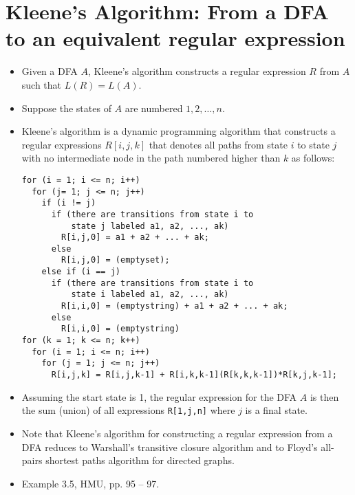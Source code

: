 \documentclass[]{article}
\begin{document}
\section{Kleene's Algorithm: From a DFA to an equivalent regular expression}
  \begin{itemize}
    \item Given a DFA $A$, Kleene's algorithm constructs a regular expression
    $R$ from $A$ such that $L(R) = L(A)$.
    \item Suppose the states of $A$ are numbered $1, 2, \ldots, n$.
    \item Kleene's algorithm is a dynamic programming algorithm that constructs
    a regular expressions $R[i, j, k]$ that denotes all paths from state $i$ to
    state $j$ with no intermediate node in the path numbered higher than $k$ as
    follows:

    \newpage
      \begin{lstlisting}
for (i = 1; i <= n; i++)
  for (j= 1; j <= n; j++)
    if (i != j)
      if (there are transitions from state i to
          state j labeled a1, a2, ..., ak)
        R[i,j,0] = a1 + a2 + ... + ak;
      else
        R[i,j,0] = (emptyset);
    else if (i == j)
      if (there are transitions from state i to
          state i labeled a1, a2, ..., ak)
        R[i,i,0] = (emptystring) + a1 + a2 + ... + ak;
      else
        R[i,i,0] = (emptystring)
for (k = 1; k <= n; k++)
  for (i = 1; i <= n; i++)
    for (j = 1; j <= n; j++)
      R[i,j,k] = R[i,j,k-1] + R[i,k,k-1](R[k,k,k-1])*R[k,j,k-1];
      \end{lstlisting}

    \item Assuming the start state is 1, the regular expression for the DFA $A$
    is then the sum (union) of all expressions \texttt{R[1,j,n]} where $j$ is a
    final state.
    \item Note that Kleene's algorithm for constructing a regular expression
    from a DFA reduces to Warshall's transitive closure algorithm and to Floyd's
    all-pairs shortest paths algorithm for directed graphs.
    \item Example 3.5, HMU, pp. 95 -- 97.
  \end{itemize}
\end{document}
